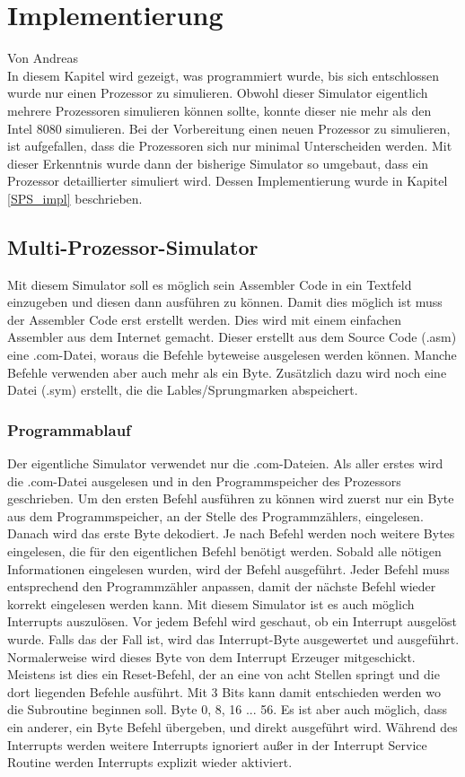 \documentclass[12pt]{article}
\begin{document}
\newpage

\section{Implementierung}
Von Andreas\\

\noindent
In diesem Kapitel wird gezeigt, was programmiert wurde, bis sich entschlossen wurde nur einen Prozessor zu simulieren. Obwohl dieser Simulator eigentlich mehrere Prozessoren simulieren können sollte, konnte dieser nie mehr als den Intel 8080 simulieren. Bei der Vorbereitung einen neuen Prozessor zu simulieren, ist aufgefallen, dass die Prozessoren sich nur minimal Unterscheiden werden. Mit dieser Erkenntnis wurde dann der bisherige Simulator so umgebaut, dass ein Prozessor detaillierter simuliert wird. Dessen Implementierung wurde in Kapitel \ref{SPS_impl} beschrieben.


\subsection{Multi-Prozessor-Simulator}
Mit diesem Simulator soll es möglich sein Assembler Code in ein Textfeld einzugeben und diesen dann ausführen zu können. Damit dies möglich ist muss der Assembler Code erst erstellt werden. Dies wird mit einem einfachen Assembler aus dem Internet gemacht. Dieser erstellt aus dem Source Code (.asm) eine .com-Datei, woraus die Befehle byteweise ausgelesen werden können. Manche Befehle verwenden aber auch mehr als ein Byte. Zusätzlich dazu wird noch eine Datei (.sym) erstellt, die die Lables/Sprungmarken abspeichert.
\noindent


\subsubsection{Programmablauf}
Der eigentliche Simulator verwendet nur die .com-Dateien. Als aller erstes wird die .com-Datei ausgelesen und in den Programmspeicher des Prozessors geschrieben. Um den ersten Befehl ausführen zu können wird zuerst nur ein Byte aus dem Programmspeicher, an der Stelle des Programmzählers, eingelesen. Danach wird das erste Byte dekodiert. 
Je nach Befehl werden noch weitere Bytes eingelesen, die für den eigentlichen Befehl benötigt werden. Sobald alle nötigen Informationen eingelesen wurden, wird der Befehl ausgeführt. Jeder Befehl muss entsprechend den Programmzähler anpassen, damit der nächste Befehl wieder korrekt eingelesen werden kann. Mit diesem Simulator ist es auch möglich Interrupts auszulösen. Vor jedem Befehl wird geschaut, ob ein Interrupt ausgelöst wurde. Falls das der Fall ist, wird das Interrupt-Byte ausgewertet und ausgeführt. Normalerweise wird dieses Byte von dem Interrupt Erzeuger mitgeschickt. Meistens ist dies ein Reset-Befehl, der an eine von acht Stellen springt und die dort liegenden Befehle ausführt. Mit 3 Bits kann damit entschieden werden wo die Subroutine beginnen soll. Byte 0, 8, 16 ... 56. Es ist aber auch möglich, dass ein anderer, ein Byte Befehl übergeben, und direkt ausgeführt wird. Während des Interrupts werden weitere Interrupts ignoriert außer in der Interrupt Service Routine werden Interrupts explizit wieder aktiviert.
\end{document}

